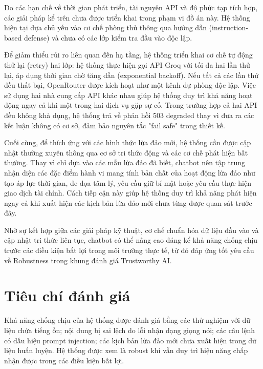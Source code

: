 Do các hạn chế về thời gian phát triển, tài nguyên API và độ phức tạp tích hợp, các giải pháp kể trên chưa được triển khai trong phạm vi đồ án này. Hệ thống hiện tại dựa chủ yếu vào cơ chế phòng thủ thông qua hướng dẫn (instruction-based defense) và chưa có các lớp kiểm tra đầu vào độc lập.

Để giảm thiểu rủi ro liên quan đến hạ tầng, hệ thống triển khai cơ chế tự động thử lại (retry) hai lớp: hệ thống thực hiện gọi API Groq với tối đa hai lần thử lại, áp dụng thời gian chờ tăng dần (exponential backoff). Nếu tất cả các lần thử đều thất bại, OpenRouter được kích hoạt như một kênh dự phòng độc lập. Việc sử dụng hai nhà cung cấp API khác nhau giúp hệ thống duy trì khả năng hoạt động ngay cả khi một trong hai dịch vụ gặp sự cố. Trong trường hợp cả hai API đều không khả dụng, hệ thống trả về phản hồi 503 degraded thay vì đưa ra các kết luận không có cơ sở, đảm bảo nguyên tắc "fail safe" trong thiết kế.

Cuối cùng, để thích ứng với các hình thức lừa đảo mới, hệ thống cần được cập nhật thường xuyên thông qua cơ sở tri thức động và các cơ chế phát hiện bất thường. Thay vì chỉ dựa vào các mẫu lừa đảo đã biết, chatbot nên tập trung nhận diện các đặc điểm hành vi mang tính bản chất của hoạt động lừa đảo như tạo áp lực thời gian, đe dọa tâm lý, yêu cầu giữ bí mật hoặc yêu cầu thực hiện giao dịch tài chính. Cách tiếp cận này giúp hệ thống duy trì khả năng phát hiện ngay cả khi xuất hiện các kịch bản lừa đảo mới chưa từng được quan sát trước đây.

Nhờ sự kết hợp giữa các giải pháp kỹ thuật, cơ chế chuẩn hóa dữ liệu đầu vào và cập nhật tri thức liên tục, chatbot có thể nâng cao đáng kể khả năng chống chịu trước các điều kiện bất lợi trong môi trường thực tế, từ đó đáp ứng tốt yêu cầu về Robustness trong khung đánh giá Trustworthy AI.

\section{Tiêu chí đánh giá}
Khả năng chống chịu của hệ thống được đánh giá bằng các thử nghiệm với dữ liệu chứa tiếng ồn; nội dung bị sai lệch do lỗi nhận dạng giọng nói; các câu lệnh có dấu hiệu prompt injection; các kịch bản lừa đảo mới chưa xuất hiện trong dữ liệu huấn luyện.
Hệ thống được xem là robust khi vẫn duy trì hiệu năng chấp nhận được trong các điều kiện bất lợi.
